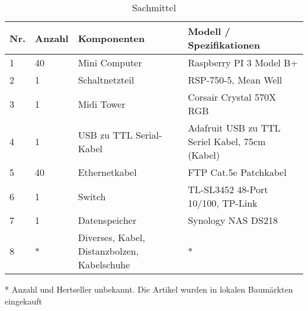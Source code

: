 \begin{table}[H]
\centering
\begin{tabular}[t]{p{1cm}p{1.2cm}p{6.5cm}p{6.5cm}}
\hline
\rowcolor{heading}\textbf{Nr.} & \textbf{Anzahl} & \textbf{Komponenten} & Modell / Spezifikationen\\\hline
1 & 40 & Mini Computer & Raspberry PI 3 Model B+\\\hline
2 & 1 & Schaltnetzteil & RSP-750-5, Mean Well\\\hline
3 & 1 & Midi Tower & Corsair Crystal 570X RGB\\\hline
4 & 1 & USB zu TTL Serial-Kabel & Adafruit USB zu TTL Seriel Kabel, 75cm (Kabel) \\\hline
5 & 40 & Ethernetkabel & FTP Cat.5e Patchkabel \\\hline
6 & 1 & Switch & TL-SL3452 48-Port 10/100, TP-Link \\\hline
7 & 1 & Datenspeicher & Synology NAS DS218\\\hline
8 & * & Diverses, Kabel, Distanzbolzen, \newline Kabelschuhe & *\\\hline
\end{tabular}
\caption{Sachmittel}
\end{table}
* Anzahl und Hertseller unbekannt. Die Artikel wurden in lokalen Baumärkten eingekauft